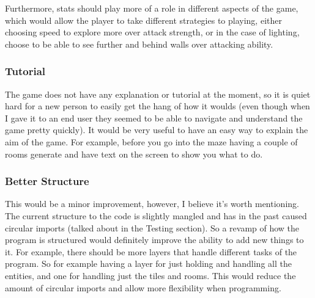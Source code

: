 \documentclass[../Main.tex]{subfiles}
\begin{document}
            Furthermore, stats should play more of a role in different aspects of the game, which would allow the player to take different strategies to playing, either choosing speed to explore more over attack strength, or in the case of lighting, choose to be able to see further and behind walls over attacking ability.

        \subsubsection{Tutorial}
            The game does not have any explanation or tutorial at the moment, so it is quiet hard for a new person to easily get the hang of how it woulds (even though when I gave it to an end user they seemed to be able to navigate and understand the game pretty quickly). It would be very useful to have an easy way to explain the aim of the game. For example, before you go into the maze having a couple of rooms generate and have text on the screen to show you what to do.

        \subsubsection{Better Structure}
            This would be a minor improvement, however, I believe it's worth mentioning. The current structure to the code is slightly mangled and has in the past caused circular imports (talked about in the Testing section). So a revamp of how the program is structured would definitely improve the ability to add new things to it. For example, there should be more layers that handle different tasks of the program. So for example having a layer for just holding and handling all the entities, and one for handling just the tiles and rooms. This would reduce the amount of circular imports and allow more flexibility when programming.
\end{document}
